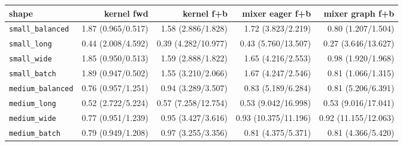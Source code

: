 \begin{tabular}{l r r r r }
\toprule
shape & kernel fwd & kernel f+b & mixer eager f+b & mixer graph f+b \\
\midrule
\texttt{small\_balanced} & 1.87 (0.965/0.517) & 1.58 (2.886/1.828) & 1.72 (3.823/2.219) & 0.80 (1.207/1.504) \\
\texttt{small\_long} & 0.44 (2.008/4.592) & 0.39 (4.282/10.977) & 0.43 (5.760/13.507) & 0.27 (3.646/13.627) \\
\texttt{small\_wide} & 1.85 (0.950/0.513) & 1.59 (2.888/1.822) & 1.65 (4.216/2.553) & 0.98 (1.920/1.968) \\
\texttt{small\_batch} & 1.89 (0.947/0.502) & 1.55 (3.210/2.066) & 1.67 (4.247/2.546) & 0.81 (1.066/1.315) \\
\texttt{medium\_balanced} & 0.76 (0.957/1.251) & 0.94 (3.289/3.507) & 0.83 (5.189/6.284) & 0.81 (5.206/6.391) \\
\texttt{medium\_long} & 0.52 (2.722/5.224) & 0.57 (7.258/12.754) & 0.53 (9.042/16.998) & 0.53 (9.016/17.041) \\
\texttt{medium\_wide} & 0.77 (0.951/1.239) & 0.95 (3.427/3.616) & 0.93 (10.375/11.196) & 0.92 (11.155/12.063) \\
\texttt{medium\_batch} & 0.79 (0.949/1.208) & 0.97 (3.255/3.356) & 0.81 (4.375/5.371) & 0.81 (4.366/5.420) \\
\bottomrule
\end{tabular}
